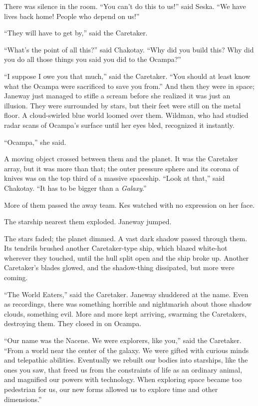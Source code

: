 \documentclass[twoside,letterpaper,12pt]{memoir}
\begin{document}
There was silence in the room. ``You can't do this to us!'' said Seska. ``We have lives back home! People who depend on us!'' 

``They will have to get by,'' said the Caretaker. 

``What's the point of all this?'' said Chakotay. ``Why did you build this? Why did you do all those things you said you did to the Ocampa?'' 

``I suppose I owe you that much,'' said the Caretaker. ``You should at least know what the Ocampa were sacrificed to save you from.'' And then they were in space; Janeway just managed to stifle a scream before she realized it was just an illusion. They were surrounded by stars, but their feet were still on the metal floor. A cloud-swirled blue world loomed over them. Wildman, who had studied radar scans of Ocampa's surface until her eyes bled, recognized it instantly. 

``Ocampa,'' she said. 

A moving object crossed between them and the planet. It was the Caretaker array, but it was more than that; the outer pressure sphere and its corona of knives was on the top third of a massive spaceship. ``Look at that,'' said Chakotay. ``It has to be bigger than a \textit{Galaxy}.'' 

More of them passed the away team. Kes watched with no expression on her face. 

The starship nearest them exploded. Janeway jumped. 

The stars faded; the planet dimmed. A vast dark shadow passed through them. Its tendrils brushed another Caretaker-type ship, which blazed white-hot wherever they touched, until the hull split open and the ship broke up. Another Caretaker's blades glowed, and the shadow-thing dissipated, but more were coming. 

``The World Eaters,'' said the Caretaker. Janeway shuddered at the name. Even as recordings, there was something horrible and nightmarish about those shadow clouds, something evil. More and more kept arriving, swarming the Caretakers, destroying them. They closed in on Ocampa. 

``Our name was the Nacene. We were explorers, like you,'' said the Caretaker. ``From a world near the center of the galaxy. We were gifted with curious minds and telepathic abilities. Eventually we rebuilt our bodies into starships, like the ones you saw, that freed us from the constraints of life as an ordinary animal, and magnified our powers with technology. When exploring space became too pedestrian for us, our new forms allowed us to explore time and other dimensions.'' 
\end{document}
